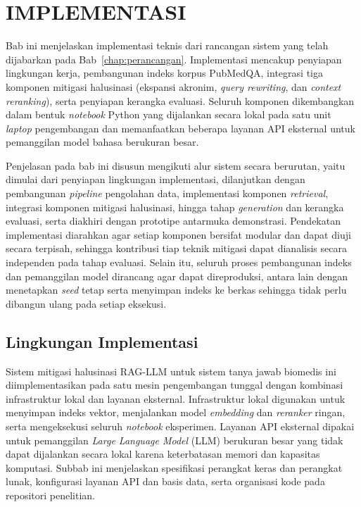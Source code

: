 
\cleardoublepage
\chapter{IMPLEMENTASI}
\label{chap:implementasi}

Bab ini menjelaskan implementasi teknis dari rancangan sistem yang telah dijabarkan pada Bab~\ref{chap:perancangan}. Implementasi mencakup penyiapan lingkungan kerja, pembangunan indeks korpus PubMedQA, integrasi tiga komponen mitigasi halusinasi (ekspansi akronim, \textit{query rewriting}, dan \textit{context reranking}), serta penyiapan kerangka evaluasi. Seluruh komponen dikembangkan dalam bentuk \textit{notebook} Python yang dijalankan secara lokal pada satu unit \textit{laptop} pengembangan dan memanfaatkan beberapa layanan API eksternal untuk pemanggilan model bahasa berukuran besar.

Penjelasan pada bab ini disusun mengikuti alur sistem secara berurutan, yaitu dimulai dari penyiapan lingkungan implementasi, dilanjutkan dengan pembangunan \textit{pipeline} pengolahan data, implementasi komponen \textit{retrieval}, integrasi komponen mitigasi halusinasi, hingga tahap \textit{generation} dan kerangka evaluasi, serta diakhiri dengan prototipe antarmuka demonstrasi. Pendekatan implementasi diarahkan agar setiap komponen bersifat modular dan dapat diuji secara terpisah, sehingga kontribusi tiap teknik mitigasi dapat dianalisis secara independen pada tahap evaluasi. Selain itu, seluruh proses pembangunan indeks dan pemanggilan model dirancang agar dapat direproduksi, antara lain dengan menetapkan \textit{seed} tetap serta menyimpan indeks ke berkas sehingga tidak perlu dibangun ulang pada setiap eksekusi.


\section{Lingkungan Implementasi}
\label{sec:lingkungan-implementasi}

Sistem mitigasi halusinasi RAG-LLM untuk sistem tanya jawab biomedis ini diimplementasikan pada satu mesin pengembangan tunggal dengan kombinasi infrastruktur lokal dan layanan eksternal. Infrastruktur lokal digunakan untuk menyimpan indeks vektor, menjalankan model \textit{embedding} dan \textit{reranker} ringan, serta mengeksekusi seluruh \textit{notebook} eksperimen. Layanan API eksternal dipakai untuk pemanggilan \textit{Large Language Model} (LLM) berukuran besar yang tidak dapat dijalankan secara lokal karena keterbatasan memori dan kapasitas komputasi. Subbab ini menjelaskan spesifikasi perangkat keras dan perangkat lunak, konfigurasi layanan API dan basis data, serta organisasi kode pada repositori penelitian.

